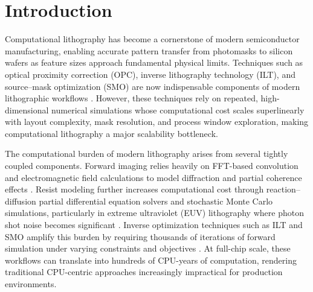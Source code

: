 \documentclass[pdflatex,sn-mathphys-num]{sn-jnl}%
\theoremstyle{thmstyleone}%
\theoremstyle{thmstyletwo}%
\theoremstyle{thmstylethree}%
\begin{document}


\maketitle

\section{Introduction}\label{sec1}
Computational lithography has become a cornerstone of modern semiconductor manufacturing, enabling accurate pattern transfer from photomasks to silicon wafers as feature sizes approach fundamental physical limits. Techniques such as optical proximity correction (OPC), inverse lithography technology (ILT), and source–mask optimization (SMO) are now indispensable components of modern lithographic workflows \cite{capodieci2006optical,cecil2022advances,chen2022label}. However, these techniques rely on repeated, high-dimensional numerical simulations whose computational cost scales superlinearly with layout complexity, mask resolution, and process window exploration, making computational lithography a major scalability bottleneck.

The computational burden of modern lithography arises from several tightly coupled components. Forward imaging relies heavily on FFT-based convolution and electromagnetic field calculations to model diffraction and partial coherence effects \cite{Zheng2023,1953RSPSA}. Resist modeling further increases computational cost through reaction–diffusion partial differential equation solvers and stochastic Monte Carlo simulations, particularly in extreme ultraviolet (EUV) lithography where photon shot noise becomes significant \cite{Gallatin2005,2017JMM&M}. Inverse optimization techniques such as ILT and SMO amplify this burden by requiring thousands of iterations of forward simulation under varying constraints and objectives \cite{cecil2022advances,Ma19}. At full-chip scale, these workflows can translate into hundreds of CPU-years of computation, rendering traditional CPU-centric approaches increasingly impractical for production environments.
\end{document}
